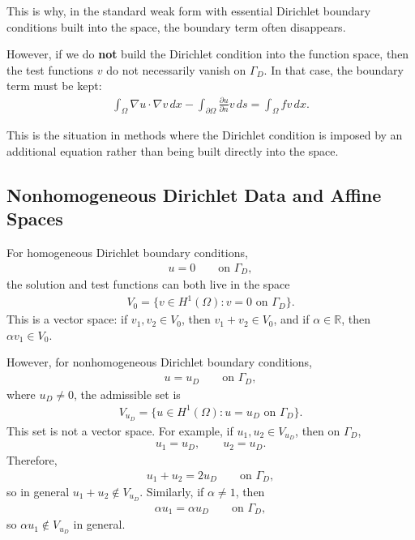 \documentclass[../main.tex]{subfiles}
\begin{document}
This is why, in the standard weak form with essential Dirichlet boundary conditions built into the space, the boundary term often disappears.

However, if we do \textbf{not} build the Dirichlet condition into the function space, then the test functions $v$ do not necessarily vanish on $\Gamma_D$. In that case, the boundary term must be kept:
\begin{align*}
    \int_\Omega \nabla u \cdot \nabla v \, dx
    -
    \int_{\partial \Omega} \frac{\partial u}{\partial n}v \, ds
    =
    \int_\Omega fv \, dx.
\end{align*}

This is the situation in methods where the Dirichlet condition is imposed by an additional equation rather than being built directly into the space.

\subsection{Nonhomogeneous Dirichlet Data and Affine Spaces}

For homogeneous Dirichlet boundary conditions,
\begin{align*}
    u = 0 \qquad \text{on } \Gamma_D,
\end{align*}
the solution and test functions can both live in the space
\begin{align*}
    V_0 = \{v \in H^1(\Omega): v=0 \text{ on } \Gamma_D\}.
\end{align*}
This is a vector space: if $v_1,v_2 \in V_0$, then $v_1+v_2 \in V_0$, and if $\alpha \in \mathbb{R}$, then $\alpha v_1 \in V_0$.

However, for nonhomogeneous Dirichlet boundary conditions,
\begin{align*}
    u = u_D \qquad \text{on } \Gamma_D,
\end{align*}
where $u_D \neq 0$, the admissible set is
\begin{align*}
    V_{u_D}
    =
    \{u \in H^1(\Omega): u=u_D \text{ on } \Gamma_D\}.
\end{align*}
This set is not a vector space. For example, if $u_1,u_2 \in V_{u_D}$, then on $\Gamma_D$,
\begin{align*}
    u_1 = u_D,
    \qquad
    u_2 = u_D.
\end{align*}
Therefore,
\begin{align*}
    u_1 + u_2 = 2u_D
    \qquad \text{on } \Gamma_D,
\end{align*}
so in general $u_1+u_2 \notin V_{u_D}$. Similarly, if $\alpha \neq 1$, then
\begin{align*}
    \alpha u_1 = \alpha u_D
    \qquad \text{on } \Gamma_D,
\end{align*}
so $\alpha u_1 \notin V_{u_D}$ in general.
\end{document}
